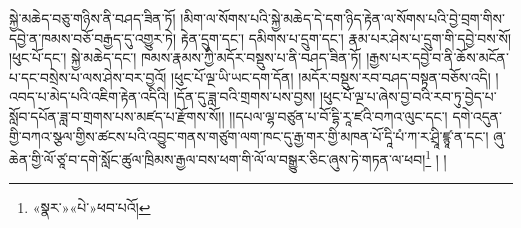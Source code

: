 སྐྱེ་མཆེད་བཅུ་གཉིས་ནི་བཤད་ཟིན་ཏོ། །མིག་ལ་སོགས་པའི་སྐྱེ་མཆེད་དེ་དག་ཉིད་རྟེན་ལ་སོགས་པའི་བྱེ་བྲག་གིས་དབྱེ་ན་ཁམས་བཅོ་བརྒྱད་དུ་འགྱུར་ཏེ། རྟེན་དྲུག་དང་། དམིགས་པ་དྲུག་དང་། རྣམ་པར་ཤེས་པ་དྲུག་གི་དབྱེ་བས་སོ། །ཕུང་པོ་དང་། སྐྱེ་མཆེད་དང་། ཁམས་རྣམས་ཀྱི་མདོར་བསྡུས་པ་ནི་བཤད་ཟིན་ཏོ། །རྒྱས་པར་དབྱེ་བ་ནི་ཆོས་མངོན་པ་དང་བསྲེས་པ་ལས་ཤེས་བར་བྱའོ། །ཕུང་པོ་ལྔ་ཡི་ཡང་དག་དོན། །མདོར་བསྡུས་རབ་བཤད་བསྟན་བཅོས་འདི། །འབད་པ་མེད་པའི་འཇིག་རྟེན་འདིའི། །དོན་དུ་ཟླ་བའི་གྲགས་པས་བྱས། །ཕུང་པོ་ལྔ་པ་ཞེས་བྱ་བའི་རབ་ཏུ་བྱེད་པ་སློབ་དཔོན་ཟླ་བ་གྲགས་པས་མཛད་པ་རྫོགས་སོ།། །།དཔལ་ལྷ་བཙུན་པ་བོ་དྷི་རཱ་ཛའི་བཀའ་ལུང་དང་། དགེ་འདུན་གྱི་བཀའ་སྩལ་གྱིས་ཚངས་པའི་འབྱུང་གནས་གཙུག་ལག་ཁང་དུ་རྒྱ་གར་གྱི་མཁན་པོ་དཱི་པཾ་ཀ་ར་ཤྲཱི་ཛྙཱ་ན་དང་། ཞུ་ཆེན་གྱི་ལོ་ཙཱ་བ་དགེ་སློང་ཚུལ་ཁྲིམས་རྒྱལ་བས་ཕག་གི་ལོ་ལ་བསྒྱུར་ཅིང་ཞུས་ཏེ་གཏན་ལ་ཕབ།\footnote{«སྣར་»«པེ་»ཕབ་པའོ།} ། །